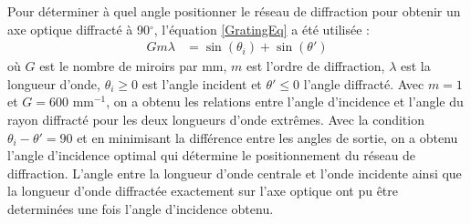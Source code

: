 \documentclass[conference]{IEEEtran}
\begin{document}
Pour déterminer à quel angle positionner le réseau de diffraction pour 
obtenir un axe optique diffracté à 90$^{\circ}$, l'équation \ref{GratingEq} a été utilisée \cite{plymouth_grating_equation}:
\begin{align}\label{GratingEq}
    G m \lambda &= \sin(\theta_i) + \sin(\theta')
\end{align}
où $G$ est le nombre de miroirs par mm, $m$ est l'ordre de diffraction, $\lambda$ est la longueur d'onde,
$\theta_i \ge 0$ est l'angle incident et $\theta' \le 0$ l'angle diffracté. Avec $m=1$ et $G=600\text{ mm}^{-1}$,
on a obtenu les relations entre l'angle d'incidence et l'angle du rayon diffracté pour les deux longueurs 
d'onde extrêmes. Avec la condition $\theta_i-\theta'=90$ et en minimisant la différence entre les angles 
de sortie, on a obtenu l'angle d'incidence optimal qui détermine le positionnement du réseau de diffraction.
L'angle entre la longueur d'onde centrale et l'onde incidente ainsi que la longueur d'onde diffractée 
exactement sur l'axe optique ont pu être determinées une fois l'angle d'incidence obtenu.
\end{document}
